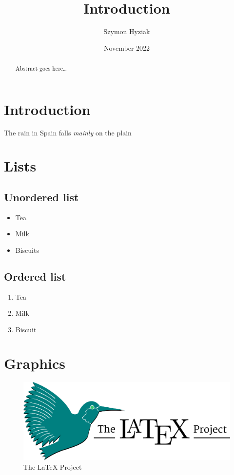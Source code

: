 \documentclass[12pt]{article}
\title{Introduction}
\author{Szymon Hyziak}
\date{November 2022}
\begin{document}
\maketitle
{}
\tableofcontents

\begin{abstract}
    Abstract goes here\ldots
\end{abstract}

\section{Introduction}

The rain in Spain falls \emph{mainly} on the plain

\section{Lists}

\subsection{Unordered list}

\begin{itemize}
    \item Tea
    \item Milk
    \item Biscuits
\end{itemize}

\subsection{Ordered list}

\begin{enumerate}
    \item Tea
    \item Milk
    \item Biscuit
\end{enumerate}

\section{Graphics} 

\begin{figure}[H]
    \centering
    \includegraphics[width=\textwidth]{img/the_latex_project.png}
    \caption{\label{}The LaTeX Project}
\end{figure}
\end{document}
